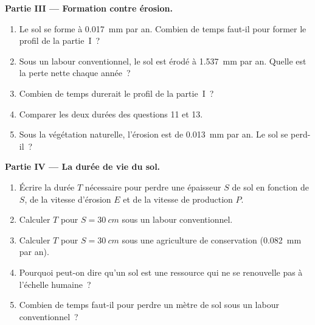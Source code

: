 \begin{problem}
\medskip
\noindent\textbf{Partie III --- Formation contre érosion.}
\begin{enumerate}[resume]
  \item Le sol se forme à \qty{0.017}{mm} par an. Combien de temps faut-il
        pour former le profil de la partie~I~?
  \item Sous un labour conventionnel, le sol est érodé à \qty{1.537}{mm}
        par an. Quelle est la perte nette chaque année~?
  \item Combien de temps durerait le profil de la partie~I~?
  \item Comparer les deux durées des questions 11 et 13.
  \item Sous la végétation naturelle, l'érosion est de \qty{0.013}{mm} par
        an. Le sol se perd-il~?
\end{enumerate}

\medskip
\noindent\textbf{Partie IV --- La durée de vie du sol.}
\begin{enumerate}[resume]
  \item Écrire la durée $T$ nécessaire pour perdre une épaisseur $S$ de sol
        en fonction de $S$, de la vitesse d'érosion $E$ et de la vitesse de
        production $P$.
  \item Calculer $T$ pour $S = \qty{30}{cm}$ sous un labour conventionnel.
  \item Calculer $T$ pour $S = \qty{30}{cm}$ sous une agriculture de
        conservation (\qty{0.082}{mm} par an).
  \item Pourquoi peut-on dire qu'un sol est une ressource qui ne se
        renouvelle pas à l'échelle humaine~?
  \item Combien de temps faut-il pour perdre un mètre de sol sous un labour
        conventionnel~?
\end{enumerate}
\end{problem}
